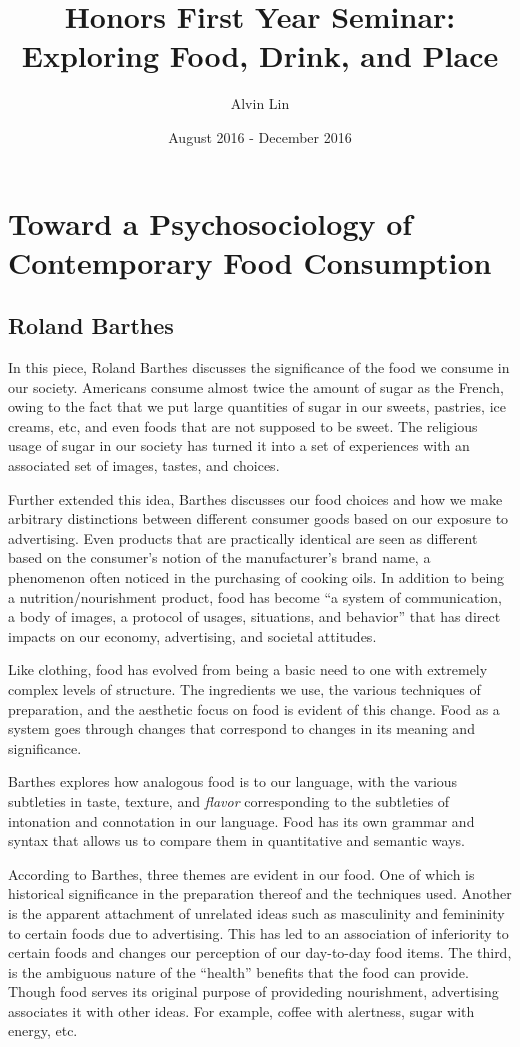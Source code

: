 \documentclass{article}
\title{Honors First Year Seminar: Exploring Food, Drink, and Place}
\author{Alvin Lin}
\date{August 2016 - December 2016}
\begin{document}
\maketitle

\section*{Toward a Psychosociology of Contemporary Food Consumption}
\subsection*{Roland Barthes}
In this piece, Roland Barthes discusses the significance of the food we consume in our society. Americans consume almost twice the amount of sugar as the French, owing to the fact that we put large quantities of sugar in our sweets, pastries, ice creams, etc, and even foods that are not supposed to be sweet. The religious usage of sugar in our society has turned it into a set of experiences with an associated set of images, tastes, and choices. \par
Further extended this idea, Barthes discusses our food choices and how we make arbitrary distinctions between different consumer goods based on our exposure to advertising. Even products that are practically identical are seen as different based on the consumer's notion of the manufacturer's brand name, a phenomenon often noticed in the purchasing of cooking oils. In addition to being a nutrition/nourishment product, food has become ``a system of communication, a body of images, a protocol of usages, situations, and behavior'' that has direct impacts on our economy, advertising, and societal attitudes. \par
Like clothing, food has evolved from being a basic need to one with extremely complex levels of structure. The ingredients we use, the various techniques of preparation, and the aesthetic focus on food is evident of this change. Food as a system goes through changes that correspond to changes in its meaning and significance. \par
Barthes explores how analogous food is to our language, with the various subtleties in taste, texture, and \textit{flavor} corresponding to the subtleties of intonation and connotation in our language. Food has its own grammar and syntax that allows us to compare them in quantitative and semantic ways. \par
According to Barthes, three themes are evident in our food. One of which is historical significance in the preparation thereof and the techniques used. Another is the apparent attachment of unrelated ideas such as masculinity and femininity to certain foods due to advertising. This has led to an association of inferiority to certain foods and changes our perception of our day-to-day food items. The third, is the ambiguous nature of the ``health'' benefits that the food can provide. Though food serves its original purpose of provideding nourishment, advertising associates it with other ideas. For example, coffee with alertness, sugar with energy, etc. \par
\end{document}
